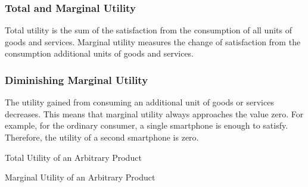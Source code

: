 \documentclass[a4paper,10pt]{article}
\makeatletter
\newenvironment{figurehere}
	{\def\@captype{figure}}{}
\makeatother
\begin{document}
\begin{multicols*}{2}
	\subsubsection{Total and Marginal Utility}
	Total utility is the sum of the satisfaction from the consumption of all units of goods and services. Marginal utility measures the change of satisfaction from the consumption additional units of goods and services.

	\subsubsection{Diminishing Marginal Utility}
	The utility gained from consuming an additional unit of goods or services decreases. This means that marginal utility always approaches the value zero. For example, for the ordinary consumer, a single smartphone is enough to satisfy. Therefore, the utility of a second smartphone is zero.

	\begin{center}
		\begin{figurehere}
			\caption{Total Utility of an Arbitrary Product}
		\end{figurehere}
		\vspace*{16pt}
		\begin{figurehere}
			\caption{Marginal Utility of an Arbitrary Product}
		\end{figurehere}
	\end{center}


\end{multicols*}
\end{document}

